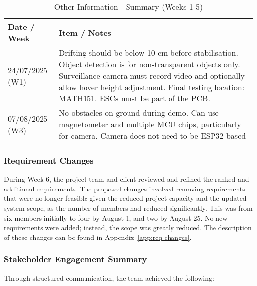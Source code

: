 \begin{table}[H]
\centering
\caption{Other Information - Summary (Weeks 1-5)}
\begin{tabular}{|p{2.5cm}|p{12cm}|}
\hline
\textbf{Date / Week} & \textbf{Item / Notes} \\ \hline
24/07/2025 (W1) &
Drifting should be below 10 cm before stabilisation.  \newline 
Object detection is for non-transparent objects only.  \newline 
Surveillance camera must record video and optionally allow hover height adjustment. \newline
Final testing location: MATH151. \newline
ESCs must be part of the PCB. \\ \hline
07/08/2025 (W3) &
No obstacles on ground during demo. \newline
Can use magnetometer and multiple MCU chips, particularly for camera. \newline Camera does not need to be ESP32-based \newline \\ \hline
\end{tabular}
\end{table}

\subsubsection{Requirement Changes} \leavevmode

During Week 6, the project team and client reviewed and refined the ranked and additional requirements.  The proposed changes involved removing requirements that were no longer feasible given the reduced project capacity and the updated system scope, as the number of members had reduced significantly. This was from six members initially to four by August 1, and two by August 25. No new requirements were added; instead, the scope was greatly reduced. The description of these changes can be found in Appendix~\ref{app:req-changes}.

\subsubsection{Stakeholder Engagement Summary} \leavevmode

Through structured communication, the team achieved the following: \

